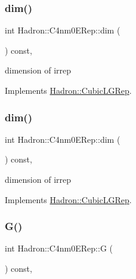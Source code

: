 \subsubsection{\texorpdfstring{dim()}{dim()}\hspace{0.1cm}{\footnotesize\ttfamily [1/2]}}
{\footnotesize\ttfamily int Hadron\+::\+C4nm0\+E\+Rep\+::dim (\begin{DoxyParamCaption}{ }\end{DoxyParamCaption}) const\hspace{0.3cm}{\ttfamily [inline]}, {\ttfamily [virtual]}}

dimension of irrep 

Implements \mbox{\hyperlink{structHadron_1_1CubicLGRep_a3acbaea26503ed64f20df693a48e4cdd}{Hadron\+::\+Cubic\+L\+G\+Rep}}.

\mbox{\label{structHadron_1_1C4nm0ERep_ad264e17a212eb7e2cf71ba25f16caa06}} 
\subsubsection{\texorpdfstring{dim()}{dim()}\hspace{0.1cm}{\footnotesize\ttfamily [2/2]}}
{\footnotesize\ttfamily int Hadron\+::\+C4nm0\+E\+Rep\+::dim (\begin{DoxyParamCaption}{ }\end{DoxyParamCaption}) const\hspace{0.3cm}{\ttfamily [inline]}, {\ttfamily [virtual]}}

dimension of irrep 

Implements \mbox{\hyperlink{structHadron_1_1CubicLGRep_a3acbaea26503ed64f20df693a48e4cdd}{Hadron\+::\+Cubic\+L\+G\+Rep}}.

\mbox{\label{structHadron_1_1C4nm0ERep_aeed131ece7b7c5203a64ac3591c75f59}} 
\subsubsection{\texorpdfstring{G()}{G()}\hspace{0.1cm}{\footnotesize\ttfamily [1/2]}}
{\footnotesize\ttfamily int Hadron\+::\+C4nm0\+E\+Rep\+::G (\begin{DoxyParamCaption}{ }\end{DoxyParamCaption}) const\hspace{0.3cm}{\ttfamily [inline]}, {\ttfamily [virtual]}}

